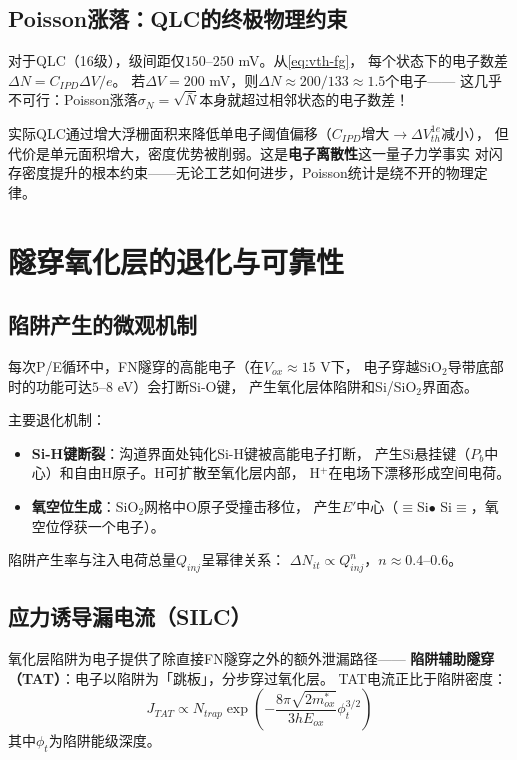 \documentclass[11pt,a4paper,openany]{book}
\theoremstyle{definition}
\theoremstyle{plain}
\theoremstyle{remark}
\begin{document}
\subsection{Poisson涨落：QLC的终极物理约束}

对于QLC（16级），级间距仅$150$--$250$ mV。从\cref{eq:vth-fg}，
每个状态下的电子数差$\Delta N = C_{IPD}\Delta V/e$。
若$\Delta V = 200$ mV，则$\Delta N \approx 200/133 \approx 1.5$个电子——
这几乎不可行：Poisson涨落$\sigma_N = \sqrt{\bar{N}}$本身就超过相邻状态的电子数差！

实际QLC通过增大浮栅面积来降低单电子阈值偏移（$C_{IPD}$增大$\to \Delta V_{th}^{1e}$减小），
但代价是单元面积增大，密度优势被削弱。这是\textbf{电子离散性}这一量子力学事实
对闪存密度提升的根本约束——无论工艺如何进步，Poisson统计是绕不开的物理定律。

\section{隧穿氧化层的退化与可靠性}

\subsection{陷阱产生的微观机制}

每次P/E循环中，FN隧穿的高能电子（在$V_{ox} \approx 15$ V下，
电子穿越SiO$_2$导带底部时的功能可达$5$--$8$ eV）会打断Si-O键，
产生氧化层体陷阱和Si/SiO$_2$界面态。

主要退化机制：
\begin{itemize}
  \item \textbf{Si-H键断裂}：沟道界面处钝化Si-H键被高能电子打断，
  产生Si悬挂键（$P_b$中心）和自由H原子。H可扩散至氧化层内部，
  H$^+$在电场下漂移形成空间电荷。
  \item \textbf{氧空位生成}：SiO$_2$网格中O原子受撞击移位，
  产生$E'$中心（$\equiv$Si$\bullet$ Si$\equiv$，氧空位俘获一个电子）。
\end{itemize}

陷阱产生率与注入电荷总量$Q_{inj}$呈幂律关系：
$\Delta N_{it} \propto Q_{inj}^n$，$n \approx 0.4$--$0.6$。

\subsection{应力诱导漏电流（SILC）}

氧化层陷阱为电子提供了除直接FN隧穿之外的额外泄漏路径——
\textbf{陷阱辅助隧穿（TAT）}：电子以陷阱为「跳板」，分步穿过氧化层。
TAT电流正比于陷阱密度：
\begin{equation}
  J_{TAT} \propto N_{trap} \exp\!\left(
    -\frac{8\pi\sqrt{2m^*_{ox}}}{3hE_{ox}}\phi_t^{3/2} \right)
\end{equation}
其中$\phi_t$为陷阱能级深度。
\end{document}
